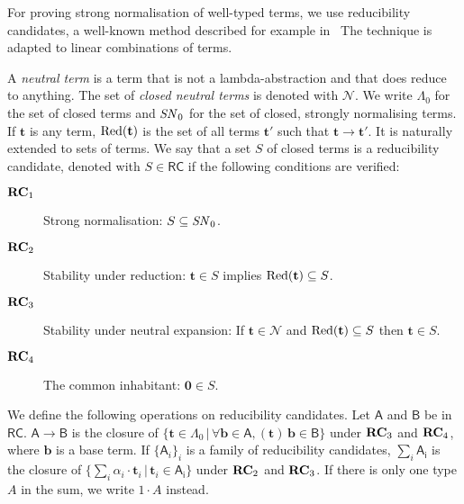 \documentclass[colorlinks=true,linkcolor=black,urlcolor=black,citecolor=blue,submission,copyright,creativecommons]{eptcs}
\newcommand{\ve}[1]{\mathrm{\textbf{#1}}}
\newcommand{\Neutral}{\mathcal{N}}
\newcommand{\CT}{\Lambda_0}
\newcommand{\SN}{{\it SN}_0}
\newcommand{\Red}{{\rm Red}}
\newcommand{\RC}{\mathsf{RC}}
\newcommand{\RCn}{{\bf RC}}
\newcommand{\bcal}[1]{\mathsf{#1}}
\begin{document}
For proving strong normalisation of well-typed terms, we use reducibility candidates, a well-known method described for example in~\cite[Ch. 14]{GirardLafontTaylor89} The technique is adapted to linear combinations of terms. 
 
A {\em neutral term} is a term that is not a lambda-abstraction and
that does reduce to anything. The set of {\em closed neutral terms} is denoted with $\Neutral$. We write $\CT$ for the set of closed terms and $\SN$ for the set of closed, strongly normalising terms. If $\ve t$ is any term, $\Red(\ve t)$ is the set of all terms $\ve t'$ such that $\ve t\to \ve t'$.
It is naturally extended to sets of terms. We say that a set $S$ of closed terms is a reducibility candidate, denoted with $S\in\RC$ if the following conditions are verified:
\begin{description}
 \item[$\RCn_1$] Strong normalisation: $S\subseteq\SN$.
 \item[$\RCn_2$] Stability under reduction: $\ve t\in S$ implies $\Red(\ve t)\subseteq S$.
 \item[$\RCn_3$] Stability under neutral expansion: If $\ve t\in\Neutral$ and $\Red(\ve t)\subseteq S$ then $\ve t\in S$.
 \item[$\RCn_4$] The common inhabitant: $\ve 0\in S$.
\end{description}
\noindent We define the following operations on reducibility
candidates. Let $\bcal{A}$ and $\bcal{B}$ be in $\RC$.
$\bcal{A}\to\bcal{B}$ is the closure of $\{\ve t\in\CT\,|\,\forall\ve
b\in\bcal{A}, (\ve t)\,\ve b\in\bcal{B}\}$ under $\RCn_3$ and
$\RCn_4$, where $\ve b$ is a base term. If $\{\bcal A_i\}_i$ is a
family of reducibility candidates, $\sum_i\bcal{A_i}$ is
the closure of $\{\sum_i\alpha_i\cdot \ve t_i\,|\,\ve t_i\in\bcal{A_i}\}$
under $\RCn_2$ and $\RCn_3$. If there is only one type $A$ in the sum, we
write $1\cdot A$ instead.
\end{document}
